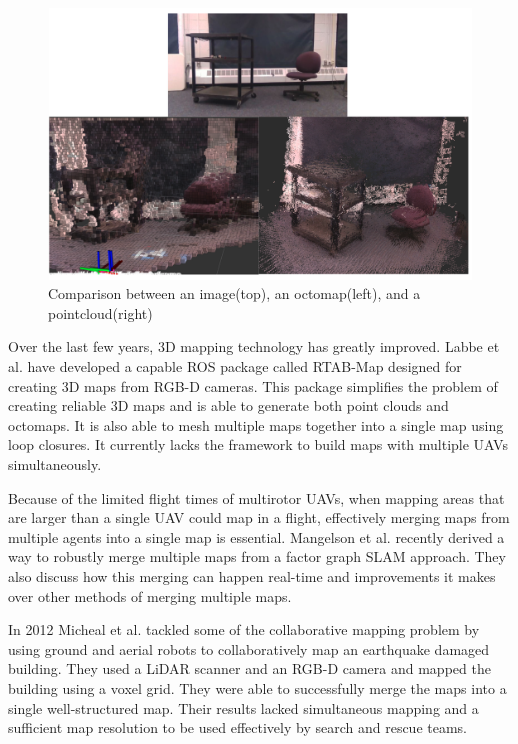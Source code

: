 \documentclass[12pt, letterpaper]{article}
\begin{document}
\begin{figure}[h] %
	\centering
	\includegraphics[trim = 0mm 0mm 0mm 0mm,clip,width=6.5in]{voxel.png}
	\caption{Comparison between an image(top), an octomap(left), and a pointcloud(right)}
	\label{fig:voxel}
\end{figure}

Over the last few years, 3D mapping technology has greatly improved. Labbe et al. \cite{Labbe2011a} \cite{Labbe2013} have developed a capable ROS package called RTAB-Map designed for creating 3D maps from RGB-D cameras. This package simplifies the problem of creating reliable 3D maps and is able to generate both point clouds and octomaps. It is also able to mesh multiple maps together into a single map using loop closures. It currently lacks the framework to build maps with multiple UAVs simultaneously.

Because of the limited flight times of multirotor UAVs, when mapping areas that are larger than a single UAV could map in a flight, effectively merging maps from multiple agents into a single map is essential. Mangelson et al. \cite{Mangelson2018} recently derived a way to robustly merge multiple maps from a factor graph SLAM approach. They also discuss how this merging can happen real-time and improvements it makes over other methods of merging multiple maps.

In 2012 Micheal et al. \cite{Michael2012} tackled some of the collaborative mapping problem by using ground and aerial robots to collaboratively map an earthquake damaged building. They used a LiDAR scanner and an RGB-D camera and mapped the building using a voxel grid. They were able to successfully merge the maps into a single well-structured map. Their results lacked simultaneous mapping and a sufficient map resolution to be used effectively by search and rescue teams.   
\end{document}
